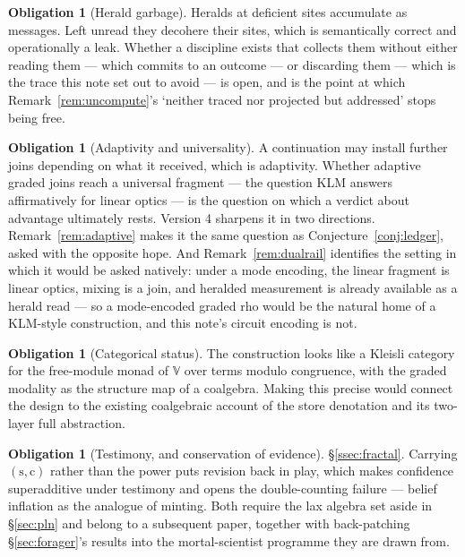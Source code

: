 \documentclass[11pt,a4paper]{article}
\theoremstyle{plain}
\theoremstyle{definition}
\newtheorem{obligation}[theorem]{Obligation}
\theoremstyle{remark}
\newcommand{\V}{\mathbb{V}}
\newcommand{\str}{\mathrm{s}}
\newcommand{\conf}{\mathrm{c}}
\begin{document}
\begin{obligation}[Herald garbage]\label{ob:garbage}
Heralds at deficient sites accumulate as messages. Left unread they decohere
their sites, which is semantically correct and operationally a leak. Whether a
discipline exists that collects them without either reading them --- which
commits to an outcome --- or discarding them --- which is the trace this note
set out to avoid --- is open, and is the point at which
Remark~\ref{rem:uncompute}'s `neither traced nor projected but addressed'
stops being free.
\end{obligation}

\begin{obligation}[Adaptivity and universality]\label{ob:klm}
A continuation may install further joins depending on what it received, which is
adaptivity. Whether adaptive graded joins reach a universal fragment --- the
question KLM answers affirmatively for linear optics --- is the question on which
a verdict about advantage ultimately rests. Version 4 sharpens it in two
directions. Remark~\ref{rem:adaptive} makes it the same question as
Conjecture~\ref{conj:ledger}, asked with the opposite hope. And
Remark~\ref{rem:dualrail} identifies the setting in which it would be asked
natively: under a mode encoding, the linear fragment is linear optics, mixing is
a join, and heralded measurement is already available as a herald read --- so a
mode-encoded graded rho would be the natural home of a KLM-style construction,
and this note's circuit encoding is not.
\end{obligation}

\begin{obligation}[Categorical status]\label{ob:cat}
The construction looks like a Kleisli category for the free-module monad of $\V$
over terms modulo congruence, with the graded modality as the structure map of a
coalgebra. Making this precise would connect the design to the existing
coalgebraic account of the store denotation and its two-layer full abstraction.
\end{obligation}

\begin{obligation}[Testimony, and conservation of evidence]\label{ob:fractal}
\S\ref{ssec:fractal}. Carrying $(\str,\conf)$ rather than the power puts
revision back in play, which makes confidence superadditive under testimony and
opens the double-counting failure --- belief inflation as the analogue of
minting. Both require the lax algebra set aside in \S\ref{sec:pln} and belong to
a subsequent paper, together with back-patching \S\ref{sec:forager}'s results
into the mortal-scientist programme they are drawn from.
\end{obligation}
\end{document}
